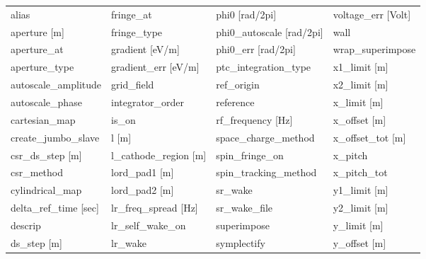  \begin{tabular}{llll} \toprule
alias                            & fringe_at                        & phi0 [rad/2pi]                   & voltage_err [Volt]               \\
aperture [m]                     & fringe_type                      & phi0_autoscale [rad/2pi]         & wall                             \\
aperture_at                      & gradient [eV/m]                  & phi0_err [rad/2pi]               & wrap_superimpose                 \\
aperture_type                    & gradient_err [eV/m]              & ptc_integration_type             & x1_limit [m]                     \\
autoscale_amplitude              & grid_field                       & ref_origin                       & x2_limit [m]                     \\
autoscale_phase                  & integrator_order                 & reference                        & x_limit [m]                      \\
cartesian_map                    & is_on                            & rf_frequency [Hz]                & x_offset [m]                     \\
create_jumbo_slave               & l [m]                            & space_charge_method              & x_offset_tot [m]                 \\
csr_ds_step [m]                  & l_cathode_region [m]             & spin_fringe_on                   & x_pitch                          \\
csr_method                       & lord_pad1 [m]                    & spin_tracking_method             & x_pitch_tot                      \\
cylindrical_map                  & lord_pad2 [m]                    & sr_wake                          & y1_limit [m]                     \\
delta_ref_time [sec]             & lr_freq_spread [Hz]              & sr_wake_file                     & y2_limit [m]                     \\
descrip                          & lr_self_wake_on                  & superimpose                      & y_limit [m]                      \\
ds_step [m]                      & lr_wake                          & symplectify                      & y_offset [m]                     \\

\end{tabular}
